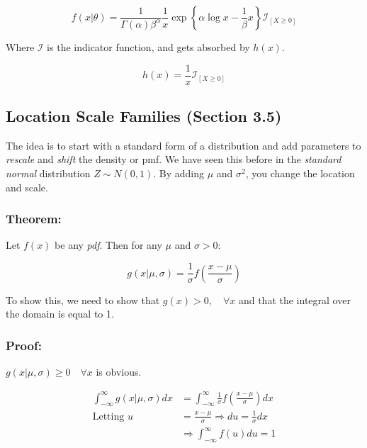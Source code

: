 \documentclass{article}
\begin{document}
\begin{equation*}
    f(x|\theta) = \frac{1}{\Gamma(\alpha)\beta^\alpha} \frac{1}{x} \exp \left\{\alpha \log x - \frac{1}{\beta} x \right\}  \mathcal{I}_{[X\geq 0]}
\end{equation*}

Where $\mathcal{I}$ is the indicator function, and gets absorbed by $h(x)$.

\begin{equation*}
    h(x) = \frac{1}{x} \mathcal{I}_{[X\geq 0]}
\end{equation*}

\subsection{Location Scale Families (Section 3.5)}

The idea is to start with a standard form of a distribution and add parameters to \textit{rescale} and \textit{shift} the density or pmf. We have seen this before in the \textit{standard normal} distribution $Z \sim N(0,1)$. By adding $\mu$ and $\sigma^2$, you change the location and scale.

\subsubsection*{Theorem:}
    Let $f(x)$ be any \textit{pdf}. Then for any $\mu$ and $\sigma>0$:
    
    \begin{equation*}
        g(x|\mu,\sigma) = \frac{1}{\sigma} f\left(\frac{x-\mu}{\sigma}\right)
    \end{equation*}

To show this, we need to show that $g(x) > 0, \quad \forall x$ and that the integral over the domain is equal to 1.

\subsubsection*{Proof:}
$g(x|\mu,\sigma)\geq 0 \quad \forall x$ is obvious.

\begin{equation*}
    \begin{split}
        \int_{-\infty}^\infty g(x|\mu,\sigma)dx  &= \int_{-\infty}^\infty \frac{1}{\sigma} f\left(\frac{x-\mu}{\sigma}\right)dx\\
        \text{Letting } u &= \frac{x-\mu}{\sigma} \Rightarrow  du = \frac{1}{\sigma}dx\\
        &\Rightarrow \int_{-\infty}^\infty f(u)du = 1
    \end{split}
\end{equation*}
\end{document}
